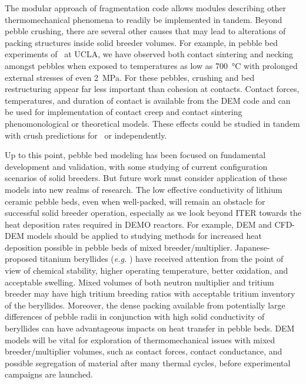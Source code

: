 The modular approach of fragmentation code allows modules describing other thermomechanical phenomena to readily be implemented in tandem. Beyond pebble crushing, there are several other causes that may lead to alterations of packing structures inside solid breeder volumes. For example, in pebble bed experiments of \lit~at UCLA, we have observed both contact sintering and necking amongst pebbles when exposed to temperatures as low as \SI{700}{\celsius} with prolonged external stresses of even \SI{2}{\mega\pascal}. For these pebbles, crushing and bed restructuring appear far less important than cohesion at contacts. Contact forces, temperatures, and duration of contact is available from the DEM code and can be used for implementation of contact creep and contact sintering phenomonological or theoretical models. These effects could be studied in tandem with crush predictions for \lit~or independently.

Up to this point, pebble bed modeling has been focused on fundamental development and validation, with some studying of current configuration scenarios of solid breeders. But future work must consider application of these models into new realms of research. The low effective conductivity of lithium ceramic pebble beds, even when well-packed, will remain an obstacle for successful solid breeder operation, especially as we look beyond ITER towards the heat deposition rates required in DEMO reactors. For example, DEM and CFD-DEM models should be applied to studying methods for increased heat deposition possible in pebble beds of mixed breeder/multiplier. Japanese-proposed titanium beryllides (\textit{e.g.} ) have received attention from the point of view of chemical stability, higher operating temperature, better oxidation, and acceptable swelling. Mixed volumes of both neutron multiplier and tritium breeder may have high tritium breeding ratios with acceptable tritium inventory of the beryllides. Moreover, the dense packing available from potentially large differences of pebble radii in conjunction with high solid conductivity of beryllides can have advantageous impacts on heat transfer in pebble beds. DEM models will be vital for exploration of thermomechanical issues with mixed breeder/multiplier volumes, such as contact forces, contact conductance, and possible segregation of material after many thermal cycles, before experimental campaigns are launched. 



